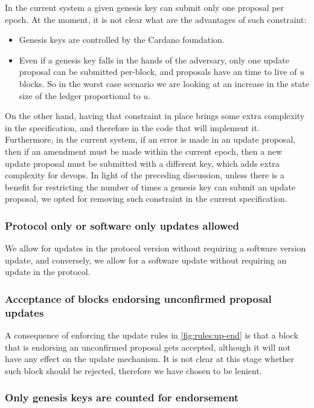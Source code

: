 In the current system a given genesis key can submit only one proposal per
epoch. At the moment, it is not clear what are the advantages of such
constraint:
\begin{itemize}
\item Genesis keys are controlled by the Cardano foundation.
\item Even if a genesis key falls in the hands of the adversary, only one
  update proposal can be submitted per-block, and proposals have an time to
  live of $u$ blocks. So in the worst case scenario we are looking at an
  increase in the state size of the ledger proportional to $u$.
\end{itemize}
On the other hand, having that constraint in place brings some extra complexity
in the specification, and therefore in the code that will implement it.
Furthermore, in the current system, if an error is made in an update proposal,
then if an amendment must be made within the current epoch, then a new update
proposal must be submitted with a different key, which adds extra complexity
for devops. In light of the preceding discussion, unless there is a benefit for
restricting the number of times a genesis key can submit an update proposal, we
opted for removing such constraint in the current specification.

\subsubsection{Protocol only or software only updates allowed}
\label{sec:ptonly-or-swonly-allowed}

We allow for updates in the protocol version without requiring a software
version update, and conversely, we allow for a software update without
requiring an update in the protocol.

\subsubsection{Acceptance of blocks endorsing unconfirmed proposal updates}
\label{sec:acceptance-of-uncofirmed-up-endorsements}

A consequence of enforcing the update rules in \cref{fig:rules:up-end} is that
a block that is endorsing an unconfirmed proposal gets accepted, although it
will not have any effect on the update mechanism. It is not clear at this stage
whether such block should be rejected, therefore we have chosen to be lenient.

\subsubsection{Only genesis keys are counted for endorsement}
\label{sec:only-genesis-keys-count-for-endorsement}

